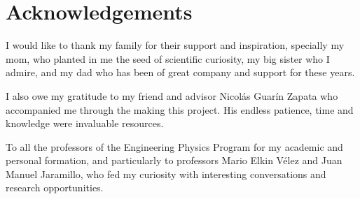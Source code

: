 \chapter{Acknowledgements}

I would like to thank my family for their support and inspiration, specially my mom, who planted in me the seed of scientific curiosity, my big sister who I admire, and my dad who has been of great company and support for these years.

I also owe my gratitude to my friend and advisor Nicol\'as Guar\'in Zapata who accompanied me through the making this project. His endless patience, time and knowledge were invaluable resources.

To all the professors of the Engineering Physics Program for my academic and personal formation, and particularly to professors Mario Elkin V\'elez and Juan Manuel Jaramillo, who fed my curiosity with interesting conversations and research opportunities.